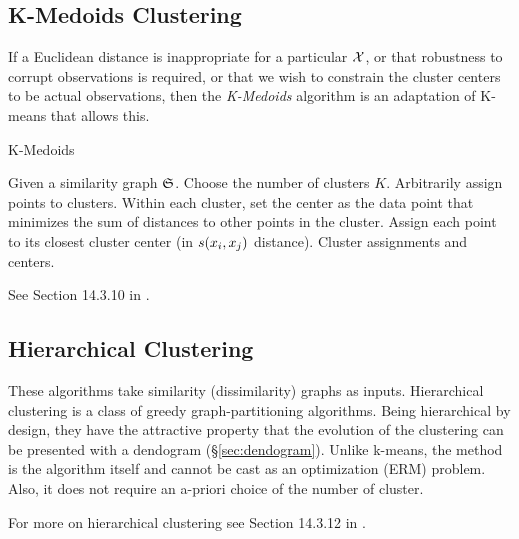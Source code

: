 \subsection{K-Medoids Clustering}
\label{sec:k_medoids}



If a Euclidean distance is inappropriate for a particular $\mathcal{X}$, or that robustness to corrupt observations is required, or that we wish to constrain the cluster centers to be actual observations, then the \emph{K-Medoids} algorithm is an adaptation of K-means that allows this.

\begin{algorithm}[H]
\caption{K-Medoids}
\begin{algorithmic}
\State Given a similarity graph $\mathfrak{S}$.
\State Choose the number of clusters $K$.
\State Arbitrarily assign points to clusters.
	\State Within each cluster, set the center as the data point that minimizes the sum of distances to other points in the cluster.
	\State Assign each point to its closest cluster center (in $s(x_i,x_j)$ distance).
\EndWhile
\State \Return Cluster assignments and centers.
\end{algorithmic}
\end{algorithm}


See Section 14.3.10 in \cite{hastie_elements_2003}.








\subsection{Hierarchical Clustering}
\label{sec:hierarchical}



These algorithms take similarity (dissimilarity) graphs as inputs.
Hierarchical clustering is a class of greedy graph-partitioning algorithms. 
Being hierarchical by design, they have the attractive property that the evolution of the clustering can be presented with a dendogram (\S\ref{sec:dendogram}).  
Unlike k-means, the method is the algorithm itself and cannot be cast as an optimization (ERM) problem.
Also, it does not require an a-priori choice of the number of cluster.

For more on hierarchical clustering see Section 14.3.12 in \cite{hastie_elements_2003}.

